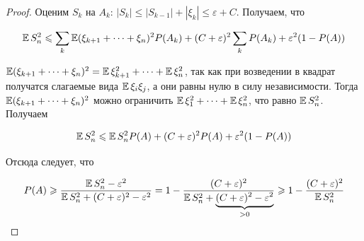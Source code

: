 \begin{proof}
Оценим $S_k$ на $A_k$: 
\( |S_k| \leqslant |S_{k - 1}| + |\xi_k| \leqslant \varepsilon + C\).
Получаем, что

\[
\operatorname{\mathbb{E}} S_n^2 \leqslant \sum_k \operatorname{\mathbb{E}} (\xi_{k + 1} + \dots + \xi_n)^2 P(A_k) + 
(C + \varepsilon)^2 \sum_k P(A_k) + \varepsilon^2 (1 - P(A))
\]

\( \operatorname{\mathbb{E}} (\xi_{k + 1} + \dots + \xi_n)^2 = \operatorname{\mathbb{E}} \xi_{k + 1}^2 + \dots + \operatorname{\mathbb{E}} \xi_n^2 \), так
как при возведении в квадрат получатся слагаемые вида $\operatorname{\mathbb{E}} \xi_i \xi_j$, а они равны нулю
в силу независимости. Тогда $\operatorname{\mathbb{E}} (\xi_{k + 1} + \dots + \xi_n)^2$ можно ограничить
\( \operatorname{\mathbb{E}} \xi_1^2 + \dots + \operatorname{\mathbb{E}} \xi_n^2 \), что равно $\operatorname{\mathbb{E}} S_n^2$. Получаем

\[
\operatorname{\mathbb{E}} S_n^2 \leqslant \operatorname{\mathbb{E}} S_n^2 P(A) + (C + \varepsilon)^2 P(A) + \varepsilon^2 (1 - P(A))
\]

Отсюда следует, что

\[
P(A) \geqslant 
\frac{\operatorname{\mathbb{E}} S_n^2 - \varepsilon^2}{\operatorname{\mathbb{E}} S_n^2 + (C + \varepsilon)^2 - \varepsilon^2} =
1 - \frac{(C + \varepsilon)^2}
{\operatorname{\mathbb{E}} S_n^2 + \underbrace{(C + \varepsilon)^2 - \varepsilon^2}_{> 0}} \geqslant
1 - \frac{(C + \varepsilon)^2}{\operatorname{\mathbb{E}} S_n^2}
\]

\end{proof}